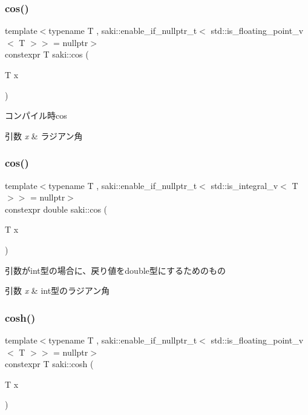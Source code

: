 \subsubsection{\texorpdfstring{cos()}{cos()}\hspace{0.1cm}{\footnotesize\ttfamily [1/2]}}
{\footnotesize\ttfamily template$<$typename T , saki\+::enable\+\_\+if\+\_\+nullptr\+\_\+t$<$ std\+::is\+\_\+floating\+\_\+point\+\_\+v$<$ T $>$$>$  = nullptr$>$ \\
constexpr T saki\+::cos (\begin{DoxyParamCaption}\item[{T}]{x }\end{DoxyParamCaption})}



コンパイル時cos 


\begin{DoxyParams}{引数}
{\em x} & ラジアン角 \\
\hline
\end{DoxyParams}
\mbox{\label{namespacesaki_ab1f49aa2d1182883ae8b4c01b346cc88}} 
\subsubsection{\texorpdfstring{cos()}{cos()}\hspace{0.1cm}{\footnotesize\ttfamily [2/2]}}
{\footnotesize\ttfamily template$<$typename T , saki\+::enable\+\_\+if\+\_\+nullptr\+\_\+t$<$ std\+::is\+\_\+integral\+\_\+v$<$ T $>$$>$  = nullptr$>$ \\
constexpr double saki\+::cos (\begin{DoxyParamCaption}\item[{T}]{x }\end{DoxyParamCaption})}



引数がint型の場合に、戻り値をdouble型にするためのもの 


\begin{DoxyParams}{引数}
{\em x} & int型のラジアン角 \\
\hline
\end{DoxyParams}
\mbox{\label{namespacesaki_a0f8167af6da5c9eb510d33dadae13708}} 
\subsubsection{\texorpdfstring{cosh()}{cosh()}\hspace{0.1cm}{\footnotesize\ttfamily [1/2]}}
{\footnotesize\ttfamily template$<$typename T , saki\+::enable\+\_\+if\+\_\+nullptr\+\_\+t$<$ std\+::is\+\_\+floating\+\_\+point\+\_\+v$<$ T $>$$>$  = nullptr$>$ \\
constexpr T saki\+::cosh (\begin{DoxyParamCaption}\item[{T}]{x }\end{DoxyParamCaption})}



